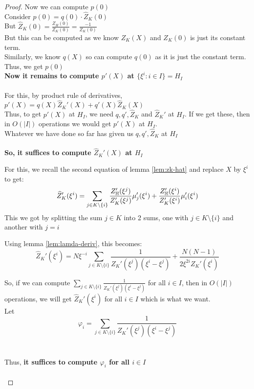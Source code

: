 \begin{proof}
    Now we can compute $p(0)$\\
    Consider $p(0)=q(0)\cdot \hat{Z}_K(0)$\\
    But $\hat{Z}_K(0)=\frac{Z_H(0)}{Z_K(0)}=\frac{-1}{Z_K(0)}$\\
    But this can be computed as we know $Z_K(X)$ and $Z_K(0)$ is just its constant term.\\
    Similarly, we know $q(X)$ so can compute $q(0)$ as it is just the constant term. \\
    Thus, we get $p(0)$\\
    \textbf{Now it remains to compute $p'(X)$ at $\{\xi^i:i \in I\}=H_I$\\\\}
    For this, by product rule of derivatives, $p'(X)=q(X) \hat{Z}_K'(X)+q'(X) \hat{Z}_K(X)$\\

    Thus, to get $p'(X)$ at $H_I$, we need $q, q', \hat{Z}_K$ and $\hat{Z}_K'$ at $H_I$. If we get these, then in $O(|I|)$ operations we would get $p'(X)$ at $H_I$.\\
    Whatever we have done so far has given us $q, q', \hat{Z}_K$ at $H_I$\\\\
    \textbf{So, it suffices to compute $\hat{Z}_K'(X)$ at $H_I$\\}

    For this, we recall the second equation of lemma \ref{lem:zk-hat} and replace $X$ by $\xi^i$ to get:\\
    $$  \widehat{Z}_K'(\xi^i) = \sum_{j\in K\setminus \{i\}} \frac{Z_{\mathbb{H}}'(\xi^j)}{Z_K'(\xi^j)}\mu_j'(\xi^i) + \frac{Z_{\mathbb{H}}'(\xi^i)}{Z_K'(\xi^i)}\mu_i'(\xi^i)$$
    This we got by splitting the sum $j \in K$ into 2 sums, one with $j \in K \setminus \{i\}$ and another with $j=i$

    Using lemma \ref{lem:lamda-deriv}, this becomes:
    $$ \widehat{Z}_K'(\xi^i)= N\xi^{-i}\sum_{j\in K\setminus \{i\}}\frac{1}{Z_K'(\xi^j)(\xi^i-\xi^j)} + \frac{N(N-1)}{2\xi^{2i}Z_K'(\xi^i)}$$


    So, if we can compute $\sum_{j\in K\setminus \{i\}}\frac{1}{Z_K'(\xi^j)(\xi^i-\xi^j)}$ for all $i \in I$, then in $O(|I|)$ operations, we will get $\hat{Z}_K'(\xi^i)$ for all $i \in I$ which is what we want.\\

    Let $$\varphi_i=\sum_{j\in K\setminus \{i\}}\frac{1}{Z_K'(\xi^j)(\xi^i-\xi^j)}$$\\\\
    Thus,\textbf{ it suffices to compute $\varphi_i$ for all $i \in I$}\\\\


\end{proof}
